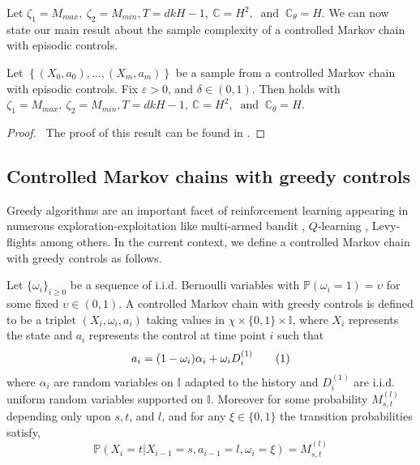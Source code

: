 \documentclass[opre,sglanonrev]{informs4}
\numberwithin{equation}{section}
\newcommand{\pow}[1]{^{(#1)}}
\newcommand{\lp}{\left(}
\newcommand{\rp}{\right)}
\newcommand{\History}{\mathcal{H}}
\newcommand{\Cbb}{\mathbb{C}}
\newcommand{\Ibb}{\mathbb{I}}
\newcommand{\Pbb}{\mathbb{P}}
\newcommand{\constant}{\Cbb}
\newcommand{\indexeddata}{\left\{(X_0,a_0),\dots,(X_m,a_m)\right\}}
\newcommand\numberthis{\addtocounter{equation}{1}\tag{\theequation}}
\newcommand{\prob}{\Pbb}
\newcommand{\eps}{\varepsilon}
\renewcommand{\epsilon}{\eps}
\begin{document}
\begin{APPENDICES}
\begin{remark}
\end{remark}
\noindent Let $\zeta_1=M_{max}, \ \zeta_2=M_{min}, T=dkH -1,\ \constant=H ^2,\ \text{ and }\  \constant_{\theta}=H $. We can now state our main result about the sample complexity of a controlled Markov chain with episodic controls.
\begin{proposition}\label{prop:episodic-mdp}
Let $\indexeddata$ be a sample from a controlled Markov chain with episodic controls. Fix $\epsilon>0$, and $\delta \in (0,1)$. Then  holds with $\zeta_1=M_{max}, \ \zeta_2=M_{min}, T=dkH -1,\ \constant=H ^2,\ \text{ and }\  \constant_{\theta}=H$.

\end{proposition}
\begin{proof} \ 
The proof of this result can be found in .
\end{proof}

\subsection{Controlled Markov chains with greedy controls}  
Greedy algorithms are an important facet of reinforcement learning appearing in numerous exploration-exploitation like multi-armed bandit \citep{kuleshov2014algorithms}, $Q$-learning \citep{wunder2010classes}, Levy-flights \citep{liu2021improving} among others. In the current context, we define a controlled Markov chain with greedy controls as follows. 
\begin{definition}
Let $\{\omega_i\}_{i\geq 0}$ be a sequence of i.i.d. Bernoulli variables with $\prob(\omega_i=1)=\upsilon$ for some fixed $\upsilon\in(0,1)$. 
A controlled Markov chain with greedy controls is defined to be a triplet $(X_i,\omega_i,a_i)$ taking values in $\chi\times\{0,1\}\times\Ibb$, where $X_i$ represents the state and $a_i$ represents the control at time point $i$ such that
\begin{align*}
   a_i = (1-\omega_i)\alpha_i+\omega_i D_i\pow{1} 
\numberthis\label{eq:greedy-eq5} 
\end{align*}
where $\alpha_i$ are random variables on $\Ibb$ adapted to the history 
and $D_i\pow{1}$ are i.i.d. uniform random variables supported on $\Ibb$. Moreover for some probability $M_{s,t}\pow{l}$ depending only upon $s,t$, and $l$, and for any $\xi\in\{0,1\}$ the transition probabilities satisfy,
\[
\prob\lp X_i=t|X_{i-1}=s,a_{i-1}=l,\omega_{i}=\xi \rp=M_{s,t}\pow{l}
\]


\end{definition}
\end{APPENDICES}
\end{document}
